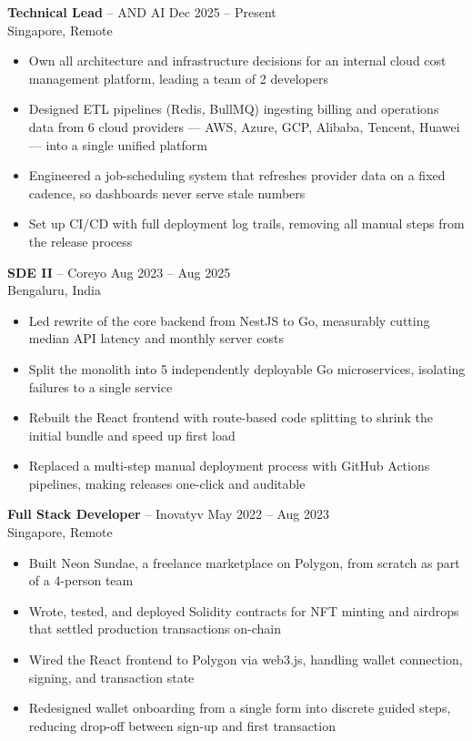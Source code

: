 \documentclass[11pt, a4paper]{article}
\newcommand{\roleheader}[4]{%
    \textbf{#1} -- #3 \hfill #2\\
    {\color{mediumtext}#4}%
}
\begin{document}
\roleheader{Technical Lead}{Dec 2025 -- Present}{AND AI}{Singapore, Remote}
\begin{itemize}
    \item Own all architecture and infrastructure decisions for an internal cloud cost management platform, leading a team of 2 developers
    \item Designed ETL pipelines (Redis, BullMQ) ingesting billing and operations data from 6 cloud providers --- AWS, Azure, GCP, Alibaba, Tencent, Huawei --- into a single unified platform
    \item Engineered a job-scheduling system that refreshes provider data on a fixed cadence, so dashboards never serve stale numbers
    \item Set up CI/CD with full deployment log trails, removing all manual steps from the release process
\end{itemize}
\vspace{3pt}

\roleheader{SDE II}{Aug 2023 -- Aug 2025}{Coreyo}{Bengaluru, India}
\begin{itemize}
    \item Led rewrite of the core backend from NestJS to Go, measurably cutting median API latency and monthly server costs
    \item Split the monolith into 5 independently deployable Go microservices, isolating failures to a single service
    \item Rebuilt the React frontend with route-based code splitting to shrink the initial bundle and speed up first load
    \item Replaced a multi-step manual deployment process with GitHub Actions pipelines, making releases one-click and auditable
\end{itemize}
\vspace{3pt}

\roleheader{Full Stack Developer}{May 2022 -- Aug 2023}{Inovatyv}{Singapore, Remote}
\begin{itemize}
    \item Built Neon Sundae, a freelance marketplace on Polygon, from scratch as part of a 4-person team
    \item Wrote, tested, and deployed Solidity contracts for NFT minting and airdrops that settled production transactions on-chain
    \item Wired the React frontend to Polygon via web3.js, handling wallet connection, signing, and transaction state
    \item Redesigned wallet onboarding from a single form into discrete guided steps, reducing drop-off between sign-up and first transaction
\end{itemize}
\vspace{3pt}
\end{document}
